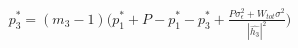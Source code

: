 \documentclass[preview]{standalone}
\begin{document}
\begin{align*}
p_3^\ast = \left(m_3 - 1\right) \Bigg( p_1^\ast + P - p_1^\ast - p_3^\ast + \frac{P \sigma_\epsilon^2 + W_{tot} \sigma^2}{\left|\hat{h_3}\right|^2} \Bigg)
\end{align*}
\end{document}
